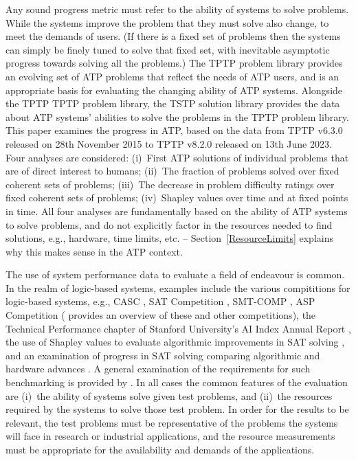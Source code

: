 \documentclass[runningheads]{llncs}
\begin{document}
Any sound progress metric must refer to the ability of systems to solve problems.
While the systems improve the problem that they must solve also change, to meet the demands
of users.
(If there is a fixed set of problems then the systems can simply be finely tuned to solve that
fixed set, with inevitable asymptotic progress towards solving all the problems.)
The TPTP problem library provides an evolving set of ATP problems that reflect the needs of 
ATP users, and is an appropriate basis for evaluating the changing ability of ATP systems.
Alongside the TPTP TPTP problem library, the TSTP solution library provides the data about ATP 
systems' abilities to solve the problems in the TPTP problem library.
This paper examines the progress in ATP, based on the data from TPTP v6.3.0 released on 
28th November 2015 to TPTP v8.2.0 released on 13th June 2023.
Four analyses are considered:
(i)~First ATP solutions of individual problems that are of direct interest to humans;
(ii)~The fraction of problems solved over fixed coherent sets of problems;
(iii)~The decrease in problem difficulty ratings over fixed coherent sets of problems;
(iv)~Shapley values over time and at fixed points in time.
All four analyses are fundamentally based on the ability of ATP systems to solve problems, and 
do not explicitly factor in the resources needed to find solutions, e.g., hardware, time limits, 
etc. -- Section~\ref{ResourceLimits} explains why this makes sense in the ATP context.

The use of system performance data to evaluate a field of endeavour is common.
In the realm of logic-based systems, examples include
the various compititions for logic-based systems, e.g., CASC \cite{Sut16}, SAT Competition 
\cite{JL+12}, SMT-COMP \cite{BdS05}, ASP Competition \cite{CI+12} (\cite{BB+19} provides an 
overview of these and other competitions),
the Technical Performance chapter of Stanford University's AI Index Annual Report \cite{MF+23},
the use of Shapley values to evaluate algorithmic improvements in SAT solving \cite{FK+16,KF+19},
and
an examination of progress in SAT solving comparing algorithmic and hardware advances \cite{FHS20}.
A general examination of the requirements for such benchmarking is provided by \cite{BLW19}.
In all cases the common features of the evaluation are (i)~the ability of systems solve given test
problems, and (ii)~the resources required by the systems to solve those test problem.
In order for the results to be relevant, the test problems must be representative of the problems
the systems will face in research or industrial applications, and the resource measurements must
be appropriate for the availability and demands of the applications.
\end{document}

